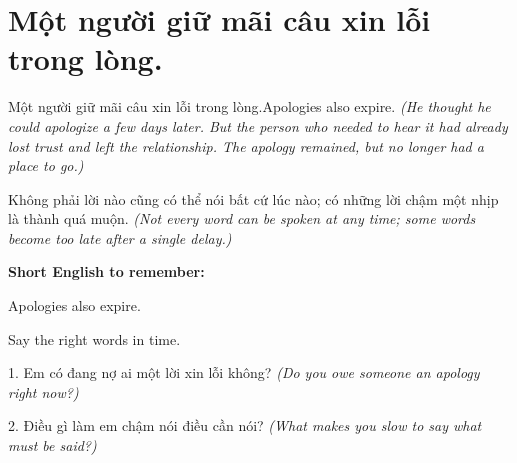 \section{Một người giữ mãi câu xin lỗi trong lòng.}
\begin{truyen}{Một người giữ mãi câu xin lỗi trong lòng.}{Apologies also expire.}
\textit{(He thought he could apologize a few days later. But the person who needed to hear it had already lost trust and left the relationship. The apology remained, but no longer had a place to go.)}
\end{truyen}
\begin{baihoc}
Không phải lời nào cũng có thể nói bất cứ lúc nào; có những lời chậm một nhịp là thành quá muộn.
\textit{(Not every word can be spoken at any time; some words become too late after a single delay.)}
\end{baihoc}
\begin{ghinhoanh}
\textbf{Short English to remember:}

Apologies also expire.

Say the right words in time.
\end{ghinhoanh}
\begin{tuhocnhanh}
1. Em có đang nợ ai một lời xin lỗi không? \textit{(Do you owe someone an apology right now?)}

2. Điều gì làm em chậm nói điều cần nói? \textit{(What makes you slow to say what must be said?)}
\end{tuhocnhanh}
\ngancach

